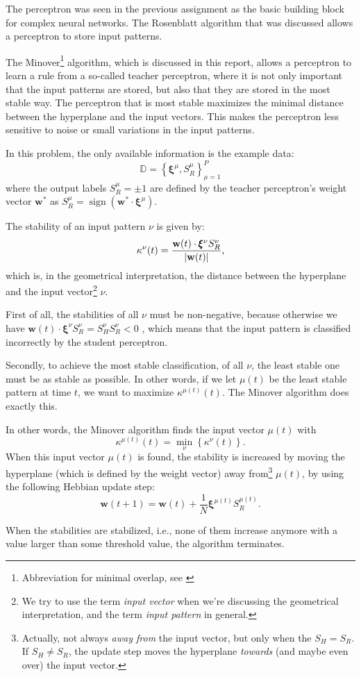 The perceptron was seen in the previous assignment as the basic building block for complex neural networks.
The Rosenblatt algorithm that was discussed allows a perceptron to store input patterns.

The Minover\footnote{Abbreviation for minimal overlap, see \cite{minover}} algorithm, which is discussed in this report, allows a perceptron to learn a rule from a so-called teacher perceptron, where it is not only important that the input patterns are stored, but also that they are stored in the most stable way.
The perceptron that is most stable maximizes the minimal distance between the hyperplane and the input vectors\cite{perceptron_slides2}.
This makes the perceptron less sensitive to noise or small variations in the input patterns.

In this problem, the only available information is the example data:
\[
	\mathbb{D} =
	\left\{
		\pmb{\xi}^\mu, S^\mu_R
	\right\}_{\mu=1}^{P}
\]
where the output labels \(S^\mu_R = \pm 1\) are defined by the teacher perceptron's weight vector \(\mathbf{w}^*\) as
\(
	S^\mu_R =
	\operatorname{sign}(
		\mathbf{w}^* \cdot \pmb{\xi}^\mu
	)
\). 

The stability of an input pattern \(\nu\) is given by:
\[
	\kappa^\nu (t) =
	\frac{
		\mathbf{w}(t) \cdot \pmb{\xi}^\nu S^\nu_R
	}{
		\lvert\mathbf{w}(t)\rvert
	}
	\text{,}
\]
which is, in the geometrical interpretation, the distance between the hyperplane and the input vector\footnote{We try to use the term \textit{input vector} when we're discussing the geometrical interpretation, and the term \textit{input pattern} in general.} \(\nu\).

First of all, the stabilities of all \(\nu\) must be non-negative, because otherwise we have
\(
	\mathbf{w}(t) \cdot \pmb{\xi}^\nu S^\nu_R = 
	S^\nu_H S^\nu_R < 0
\)
, which means that the input pattern is classified incorrectly by the student perceptron.

Secondly, to achieve the most stable classification, of all \(\nu\), the least stable one must be as stable as possible.
In other words, if we let \(\mu(t)\) be the least stable pattern at time \(t\), we want to maximize \(\kappa^{\mu(t)}(t)\).
The Minover algorithm does exactly this.

In other words, the Minover algorithm finds the input vector \(\mu(t)\) with
\[ 
	\kappa^{\mu(t)}(t) = \underset{\nu}{\operatorname{min}} 
	\left\{
		\kappa^\nu (t)
	\right\}
	\text{.}
\]
When this input vector \(\mu(t)\) is found, the stability is increased by moving the hyperplane (which is defined by the weight vector) away from\footnote{
	Actually, not always \textit{away from} the input vector, but only when the \(S_H=S_R\). If \(S_H \neq S_R\), the update step moves the hyperplane \textit{towards} (and maybe even over) the input vector.
} \(\mu(t)\), by using the following Hebbian update step:
\[
	\mathbf{w}(t+1) =
	\mathbf{w}(t) + \frac{1}{N} \pmb{\xi}^{\mu(t)}S^{\mu(t)}_R
	\text{.}
\]

When the stabilities are stabilized, i.e., none of them increase anymore with a value larger than some threshold value, the algorithm terminates.